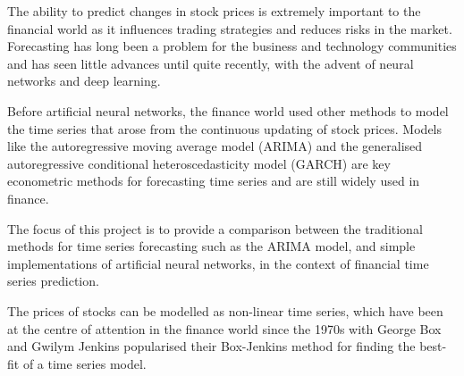 The ability to predict changes in stock prices is extremely important to the financial world as it influences trading strategies and reduces risks in the market. Forecasting has long been a problem for the business and technology communities and has seen little advances until quite recently, with the advent of neural networks and deep learning.

Before artificial neural networks, the finance world used other methods to model the time series that arose from the continuous updating of stock prices. Models like the autoregressive moving average model (ARIMA) and the generalised autoregressive conditional heteroscedasticity model (GARCH) are key econometric methods for forecasting time series and are still widely used in finance.

The focus of this project is to provide a comparison between the traditional methods for time series forecasting such as the ARIMA model, and simple implementations of artificial neural networks, in the context of financial time series prediction. 

The prices of stocks can be modelled as non-linear time series, which have been at the centre of attention in the finance world since the 1970s with George Box and Gwilym Jenkins popularised their Box-Jenkins method for finding the best-fit of a time series model\cite{box_jenkins}.

